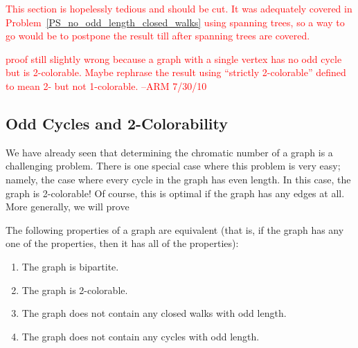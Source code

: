 \begin{editingnotes}
  \textcolor{red}{ This section is hopelessly tedious and should be cut.
    It was adequately covered in
    Problem~\ref{PS_no_odd_length_closed_walks} using spanning trees, so a
    way to go would be to postpone the result till after spanning trees
    are covered.}

  \textcolor{red}{proof still slightly wrong because a graph with a single vertex
  has no odd cycle but is 2-colorable.  Maybe rephrase the result using
  ``strictly 2-colorable'' defined to mean 2- but not 1-colorable.  --ARM
  7/30/10}
\end{editingnotes}

\subsection{Odd Cycles and 2-Colorability}

We have already seen that determining the chromatic number of a graph
is a challenging problem.  There is one special case where this
problem is very easy; namely, the case where every cycle in the graph
has even length.  In this case, the graph is 2-colorable!  Of course,
this is optimal if the graph has any edges at all.  More generally, we
will prove

\begin{theorem}\label{thm:XY}
The following properties of a graph are equivalent (that is, if the
graph has any one of the properties, then it has all of the
properties):
\begin{enumerate}

\item\label{thm:XY:i}
The graph is bipartite.

\item\label{thm:XY:ii}
The graph is 2-colorable.

\item\label{thm:XY:iii}
The graph does not contain any closed walks with odd length.

\item\label{thm:XY:iv}
The graph does not contain any cycles with odd length.

\end{enumerate}
\end{theorem}

